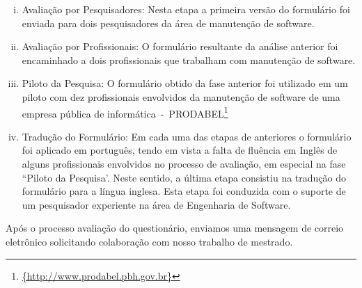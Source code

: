 \begin{enumerate}[(i)]
	\item Avaliação por Pesquisadores: Nesta etapa a primeira versão do
		formulário foi enviada para dois pesquisadores da área de manutenção de
		software.
	\item Avaliação por Profissionais: O formulário resultante da análise
		anterior foi encaminhado a dois profissionais que trabalham com
		manutenção de software.
	\item Piloto da Pesquisa: O formulário obtido da fase anterior foi utilizado
		em um piloto com dez profissionais envolvidos da manutenção de software
		de uma empresa pública de
		informática~-~PRODABEL\footnote{\url{{http://www.prodabel.pbh.gov.br}}}
	\item Tradução do Formulário: Em cada uma das etapas de anteriores o
		formulário foi aplicado em português, tendo em vista a falta de fluência
		em Inglês de alguns profissionais envolvidos no processo de avaliação,
		em especial na fase ``Piloto da Pesquisa'. Neste sentido, a última etapa
		consistiu na tradução do formulário para a língua inglesa. Esta etapa
		foi conduzida com  o suporte de um pesquisador experiente na área de
		Engenharia de Software.
\end{enumerate}

Após o processo avaliação do questionário, enviamos uma mensagem de correio
eletrônico solicitando colaboração com nosso trabalho de mestrado.





